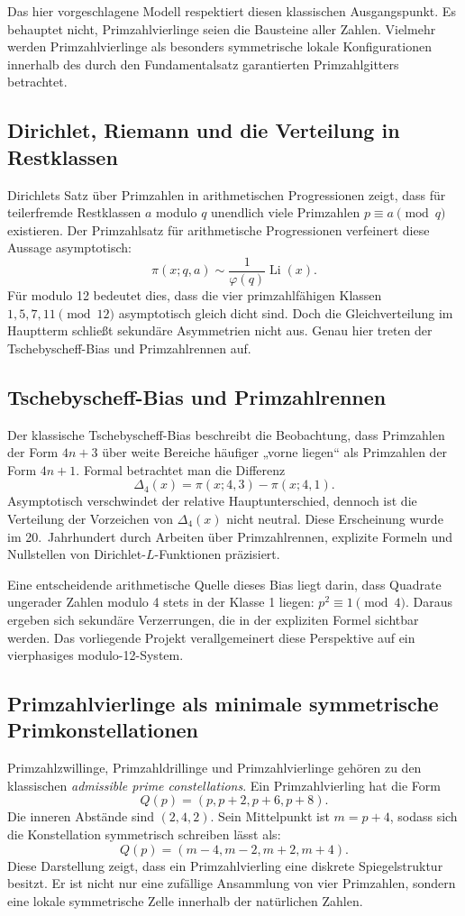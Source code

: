 \documentclass[11pt,a4paper,bibliography=totoc]{scrartcl}
\begin{document}
Das hier vorgeschlagene Modell respektiert diesen klassischen Ausgangspunkt. Es behauptet nicht, Primzahlvierlinge seien die Bausteine aller Zahlen. Vielmehr werden Primzahlvierlinge als besonders symmetrische lokale Konfigurationen innerhalb des durch den Fundamentalsatz garantierten Primzahlgitters betrachtet.

\subsection{Dirichlet, Riemann und die Verteilung in Restklassen}
Dirichlets Satz über Primzahlen in arithmetischen Progressionen zeigt, dass für teilerfremde Restklassen $a$ modulo $q$ unendlich viele Primzahlen $p \equiv a \pmod q$ existieren. Der Primzahlsatz für arithmetische Progressionen verfeinert diese Aussage asymptotisch:
\[
\pi(x; q, a) \sim \frac{1}{\varphi(q)} \operatorname{Li}(x).
\]
Für modulo 12 bedeutet dies, dass die vier primzahlfähigen Klassen $1, 5, 7, 11 \pmod{12}$ asymptotisch gleich dicht sind. Doch die Gleichverteilung im Hauptterm schließt sekundäre Asymmetrien nicht aus. Genau hier treten der Tschebyscheff-Bias und Primzahlrennen auf.

\subsection{Tschebyscheff-Bias und Primzahlrennen}
Der klassische Tschebyscheff-Bias beschreibt die Beobachtung, dass Primzahlen der Form $4n+3$ über weite Bereiche häufiger „vorne liegen“ als Primzahlen der Form $4n+1$. Formal betrachtet man die Differenz
\[
\Delta_4(x) = \pi(x; 4, 3) - \pi(x; 4, 1).
\]
Asymptotisch verschwindet der relative Hauptunterschied, dennoch ist die Verteilung der Vorzeichen von $\Delta_4(x)$ nicht neutral. Diese Erscheinung wurde im 20.\ Jahrhundert durch Arbeiten über Primzahlrennen, explizite Formeln und Nullstellen von Dirichlet-$L$-Funktionen präzisiert.

Eine entscheidende arithmetische Quelle dieses Bias liegt darin, dass Quadrate ungerader Zahlen modulo 4 stets in der Klasse 1 liegen: $p^2 \equiv 1 \pmod 4$. Daraus ergeben sich sekundäre Verzerrungen, die in der expliziten Formel sichtbar werden. Das vorliegende Projekt verallgemeinert diese Perspektive auf ein vierphasiges modulo-12-System.

\subsection{Primzahlvierlinge als minimale symmetrische Primkonstellationen}
Primzahlzwillinge, Primzahldrillinge und Primzahlvierlinge gehören zu den klassischen \emph{admissible prime constellations}. Ein Primzahlvierling hat die Form
\[
Q(p) = (p, p+2, p+6, p+8).
\]
Die inneren Abstände sind $(2, 4, 2)$. Sein Mittelpunkt ist $m = p+4$, sodass sich die Konstellation symmetrisch schreiben lässt als:
\[
Q(p) = (m-4, m-2, m+2, m+4).
\]
Diese Darstellung zeigt, dass ein Primzahlvierling eine diskrete Spiegelstruktur besitzt. Er ist nicht nur eine zufällige Ansammlung von vier Primzahlen, sondern eine lokale symmetrische Zelle innerhalb der natürlichen Zahlen.
\end{document}
